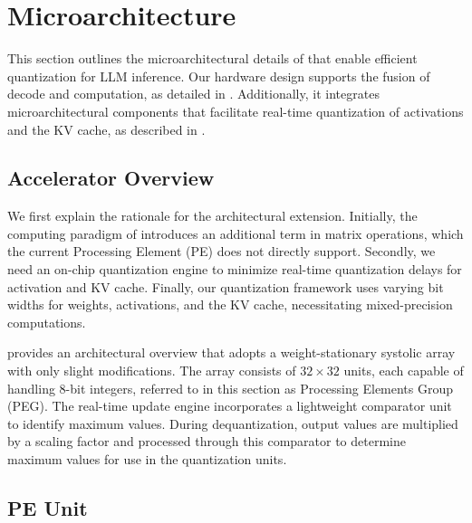
\section{\proj Microarchitecture}
\label{sec:architecture}



This section outlines the microarchitectural details of \proj{} that enable efficient quantization for LLM inference. Our hardware design supports the fusion of \proj{} decode and computation, as detailed in . Additionally, it integrates microarchitectural components that facilitate real-time quantization of activations and the KV cache, as described in .


\subsection{Accelerator Overview}

We first explain the rationale for the architectural extension. 
Initially, the computing paradigm of \proj{} introduces an additional term in matrix operations, which the current Processing Element (PE) does not directly support. 
Secondly, we need an on-chip quantization engine to minimize real-time quantization delays for activation and KV cache. 
Finally, our quantization framework uses varying bit widths for weights, activations, and the KV cache, necessitating mixed-precision computations.


 provides an architectural overview that adopts a weight-stationary systolic array with only slight modifications.
The array consists of $32 \times 32$ units, each capable of handling 8-bit integers, referred to in this section as Processing Elements Group (PEG).
The real-time update engine incorporates a lightweight comparator unit to identify maximum values.
During dequantization, output values are multiplied by a scaling factor and processed through this comparator to determine maximum values for use in the quantization units.



\subsection{\proj PE Unit}
\label{sec:pe_unit}

